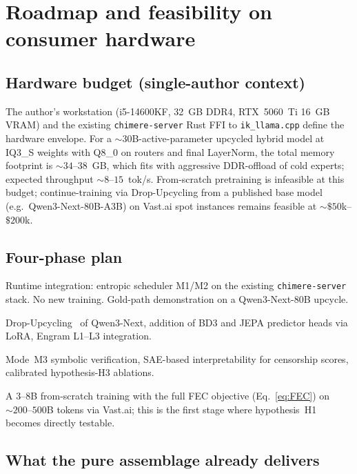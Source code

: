 \documentclass[10pt,a4paper]{article}
\theoremstyle{remark}
\begin{document}
\section{Roadmap and feasibility on consumer hardware}
\label{sec:roadmap}

\subsection{Hardware budget (single-author context)}

The author's workstation (i5-14600KF, 32~GB DDR4, RTX~5060~Ti 16~GB
VRAM) and the existing \texttt{chimere-server} Rust FFI to
\texttt{ik\_llama.cpp} define the hardware envelope. For a
$\sim 30$B-active-parameter upcycled hybrid model at IQ3\_S weights
with Q8\_0 on routers and final LayerNorm, the total memory
footprint is $\sim 34$--$38$~GB, which fits with aggressive
DDR-offload of cold experts; expected throughput $\sim 8$--$15$~tok/s.
From-scratch pretraining is infeasible at this budget; continue-training
via Drop-Upcycling \cite{DropUpcycling2025} from a published base
model (e.g.\ Qwen3-Next-80B-A3B) on Vast.ai spot instances remains
feasible at $\sim\$50$k--$\$200$k.

\subsection{Four-phase plan}

\begin{description}[leftmargin=*,itemsep=3pt]
 \item[Phase 1 (months 0--3).] Runtime integration: entropic
   scheduler M1/M2 on the existing \texttt{chimere-server} stack.
   No new training. Gold-path demonstration on a Qwen3-Next-80B
   upcycle.
 \item[Phase 2 (months 3--8).] Drop-Upcycling~\cite{DropUpcycling2025}
   of Qwen3-Next, addition of BD3 and JEPA predictor heads via
   LoRA, Engram L1--L3 integration.
 \item[Phase 3 (months 8--14).] Mode~M3 symbolic verification,
   SAE-based interpretability for censorship scores, calibrated
   hypothesis-H3 ablations.
 \item[Phase 4 (months 14--24).] A $3$--$8$B from-scratch training
   with the full FEC objective (Eq.~\ref{eq:FEC}) on
   $\sim 200$--$500$B tokens via Vast.ai; this is the first stage
   where hypothesis~H1 becomes directly testable.
\end{description}

\subsection{What the pure assemblage already delivers}
\end{document}
